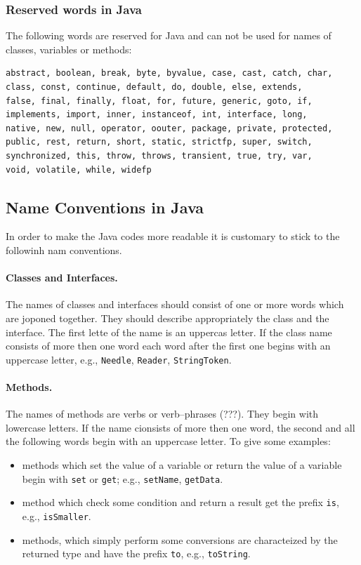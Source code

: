 \subsubsection{Reserved words in Java}
The following words are reserved for Java and can not be used for names
of classes, variables or methods:
\begin{verbatim}
abstract, boolean, break, byte, byvalue, case, cast, catch, char,
class, const, continue, default, do, double, else, extends,
false, final, finally, float, for, future, generic, goto, if,
implements, import, inner, instanceof, int, interface, long,
native, new, null, operator, oouter, package, private, protected, 
public, rest, return, short, static, strictfp, super, switch, 
synchronized, this, throw, throws, transient, true, try, var,
void, volatile, while, widefp
\end{verbatim}


\subsection{Name Conventions in Java}
In order to make the Java codes more readable it is customary to stick
to the followinh nam conventions.

\paragraph{Classes and Interfaces.} The names of classes and interfaces
  should consist of one or more words which are joponed together. They
  should describe appropriately the class and the interface. 
The first lette of the name is an uppercas letter. If the
  class name consists of more then one word each word after the first
  one begins with an uppercase letter, e.g., \verb|Needle|,
  \verb|Reader|, \verb|StringToken|.

\paragraph{Methods.} The names of methods are verbs or verb--phrases
  (???). They begin with lowercase letters. If the name cionsists of
  more then one word, the second and all the following words begin
  with an uppercase letter. To give some examples:
\begin{itemize}
\item methods which set the value of a variable or return the value of
  a variable begin with \verb|set| or \verb|get|; e.g.,
  \verb|setName|, \verb|getData|.
\item method which check some condition and return a result  get the
  prefix \verb|is|, e.g., \verb|isSmaller|.
\item methods, which simply perform some conversions are characteized
  by the returned type and have the prefix \verb|to|, e.g.,
  \verb|toString|.
\end{itemize}

